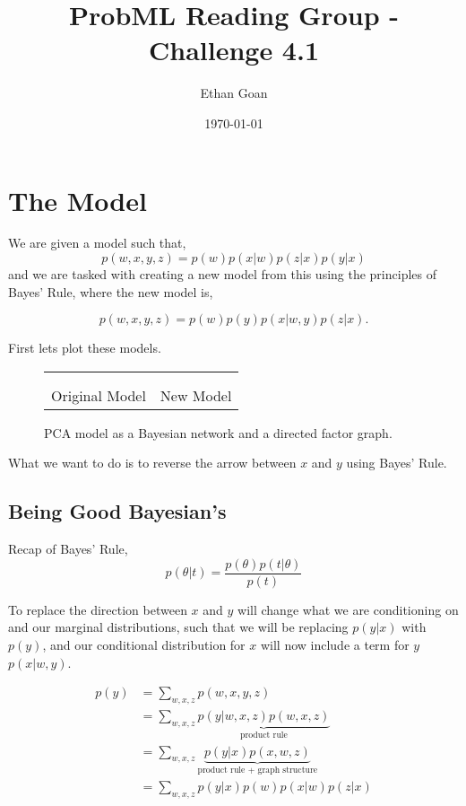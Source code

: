 \documentclass[11pt]{article}
\author{Ethan Goan}
\date{\today}
\title{ProbML Reading Group - Challenge 4.1}
\begin{document}
\maketitle


\section{The Model}
\label{sec:org5b48f49}
We are given a model such that,
\[ p(w,x,y,z) = p(w)p(x|w)p(z|x)p(y|x) \]
and we are tasked with creating a new model from this using the principles of Bayes' Rule, where the new model is,

\[ p(w,x,y,z) = p(w)p(y)p(x|w,y)p(z|x). \]

First lets plot these models.
\begin{figure}[!h]
  \begin{center}
    \begin{tabular}{L{5cm}R{5cm}}
       &
      
      \\
      \\
      Original Model & New Model
    \end{tabular}
  \end{center}
  \caption{PCA model as a Bayesian network and a directed factor
    graph.}
\end{figure}


What we want to do is to reverse the arrow between \(x\) and \(y\) using Bayes' Rule.

\subsection{Being Good Bayesian's}
Recap of Bayes' Rule,
\[ p(\theta | t)  =  \frac{p(\theta) p(t | \theta)}{p(t)}\]

To replace the direction between \(x\) and \(y\) will change what we are conditioning on and our marginal distributions, such that we will be replacing
\(p(y|x)\) with \(p(y)\), and our conditional distribution for \(x\) will now include a term for \(y\) \(p(x | w, y)\).

\begin{align*}
p(y) &= \sum_{w,x,z} p(w,x,y,z)
\\
 & = \sum_{w,x,z} \underbrace{p(y|w,x,z)p(w,x,z)}_{\text{product rule}}
\\
 & = \sum_{w,x,z} \underbrace{p(y|x)p(x,w,z)}_{\text{product rule + graph structure}}
\\
 & = \sum_{w,x,z} p(y|x) p(w) p(x|w)p(z|x)
\end{align*}
\end{document}
